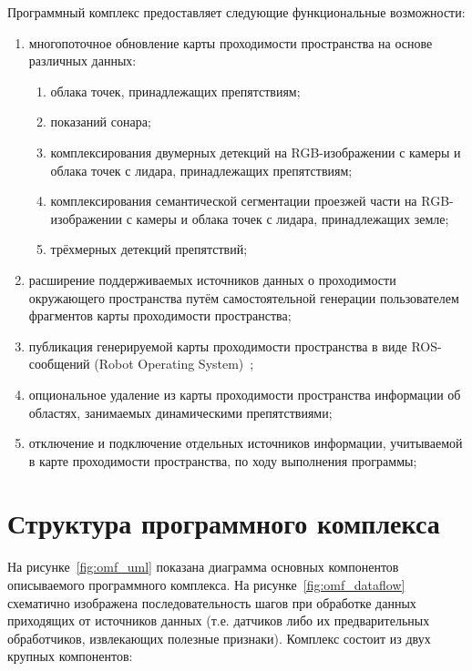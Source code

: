 Программный комплекс предоставляет следующие функциональные возможности:

\begin{enumerate}
\item многопоточное обновление карты проходимости пространства на основе различных данных:
\begin{enumerate}
	\item облака точек, принадлежащих препятствиям;
	\item показаний сонара;
	\item комплексирования двумерных детекций на RGB-изображении с камеры и облака точек с лидара, принадлежащих препятствиям;
	\item комплексирования семантической сегментации проезжей части на RGB-изображении с камеры и облака точек с лидара, принадлежащих земле;
	\item трёхмерных детекций препятствий;
\end{enumerate}
\item расширение поддерживаемых источников данных о проходимости окружающего пространства путём самостоятельной генерации пользователем фрагментов карты проходимости пространства;
\item публикация генерируемой карты проходимости пространства в виде ROS-сообщений (Robot Operating System)~\cite{quigley2009ros};
\item опциональное удаление из карты проходимости пространства информации об областях, занимаемых динамическими препятствиями;
\item отключение и подключение отдельных источников информации, учитываемой в карте проходимости пространства, по ходу выполнения программы;
\end{enumerate}

\section{Структура программного комплекса}

На рисунке~\cref{fig:omf_uml} показана диаграмма основных компонентов описываемого программного комплекса. На рисунке~\cref{fig:omf_dataflow} схематично изображена последовательность шагов при обработке данных приходящих от источников данных (т.е. датчиков либо их предварительных обработчиков, извлекающих полезные признаки). Комплекс состоит из двух крупных компонентов:

